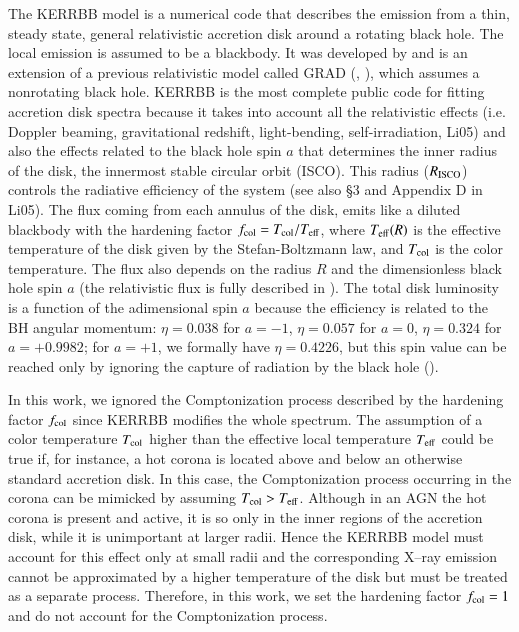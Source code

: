 \documentclass{aa}
\begin{document}
The KERRBB model is a numerical code that describes the emission from a thin, steady state, general relativistic accretion disk around a rotating black hole. The local emission is assumed to be a blackbody. It was developed by \citet{Lietal} and is an extension of a previous relativistic model called GRAD (\citealt{Hanawa}, \citealt{Ebietal}), which assumes a nonrotating black hole. KERRBB is the most complete public code for fitting accretion disk spectra because it takes into account all the relativistic effects (i.e. Doppler beaming, gravitational redshift, light-bending, self-irradiation, Li05) and also the effects related to the black hole spin $a$ that determines the inner radius of the disk, the innermost stable circular orbit (ISCO). This radius ($R_{\rm ISCO}$) controls the radiative efficiency of the system (see also \S 3 and Appendix D in Li05). The flux coming from each annulus of the disk, emits like a diluted blackbody with the hardening factor $f_{\rm col} = T_{\rm col} / T_{\rm eff}$, where $T_{\rm eff} (R)$ is the effective temperature of the disk given by the Stefan-Boltzmann law, and $T_{\rm col}$ is the color temperature. The flux also depends on the radius $R$ and the dimensionless black hole spin $a$ (the relativistic flux is fully described in \citealt{PageTho}). The total disk luminosity is a function of the adimensional spin $a$ because the efficiency is related to the BH angular momentum: $\eta = 0.038$ for $a = -1$, $\eta = 0.057$ for $a = 0$, $\eta = 0.324$ for $a = +0.9982$; for $a = +1$, we formally have $\eta = 0.4226$, but this spin value can be reached only by ignoring the capture of radiation by the black hole (\citealt{Thorn74}).

In this work, we ignored the Comptonization process described by the hardening factor $f_{\rm col}$ since KERRBB modifies the whole spectrum. The assumption of a color temperature $T_{\rm col}$ higher than the effective local temperature $T_{\rm eff}$ could be true if, for instance, a hot corona is located above and below an otherwise standard accretion disk. In this case, the Comptonization process occurring in the corona can be mimicked by assuming $T_{\rm col} > T_{\rm eff}$. Although in an AGN the hot corona is present and active, it is so only in the inner regions of the accretion disk, while it is unimportant at larger radii. Hence the KERRBB model must account for this effect only at small radii and the corresponding X--ray emission cannot be approximated by a higher temperature of the disk but must be treated as a separate process. Therefore, in this work, we set the hardening factor $f_{\rm col} = 1$ and do not account for the Comptonization process. 
\end{document}
